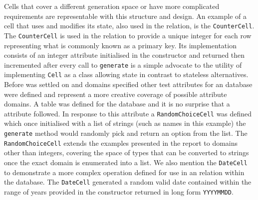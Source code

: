 Cells that cover a different generation space or have more complicated
requirements are representable with this structure and design. An
example of a cell that uses and modifies its state, also used in the
 relation, is the \lstinline{CounterCell}. The
\lstinline{CounterCell} is used in the  relation to provide
a unique integer for each row representing what is commonly known as a primary
key. Its implementation consists of an integer
attribute initialised in the constructor and returned then incremented after
every call to \lstinline{generate} is a simple advocate to the utility of implementing
\lstinline{Cell} as a class allowing state in contrast to stateless alternatives. Before
 was settled on and domains specified other test attributes
for an  database were defined and represent a more creative
coverage of possible attribute domains. A  table was defined
for the  database and it is no surprise that a
 attribute followed. In response to this attribute
a \lstinline{RandomChoiceCell} was defined which once initialised with a list
of strings (such as names in this example) the \lstinline{generate} method
would randomly pick and return an option from the list. The
\lstinline{RandomChoiceCell} extends the examples presented in the report to
domains other than integers, covering the space of types that can be converted
to strings once the exact domain is enumerated into a list. We also mention the
\lstinline{DateCell} to
demonstrate a more complex operation defined
for use in an  relation within the 
database. The \lstinline{DateCell} generated a random valid date contained within the range of
years provided in the constructor returned in long form \verb|YYYYMMDD|.

